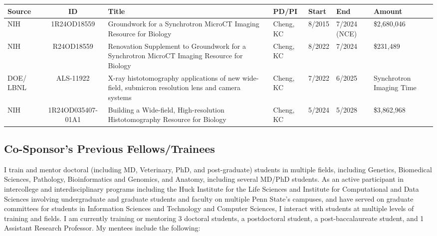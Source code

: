 \documentclass{NIHGrant}
\begin{document}
\begin{center}
\renewcommand{\arraystretch}{1.3}
  \fontsize{9pt}{9pt}\selectfont
  \begin{tabular}{| p{0.5in} | c | p{1.5in} | p{1in} | p{0.5in} | p{0.5in} | p{0.7in} |}
    \hline 
    \textbf{Source} & \textbf{ID} & \textbf{Title} & \textbf{PD/PI} & \textbf{Start} & \textbf{End} & \textbf{Amount} \\
    \hline
    NIH & 1R24OD18559 & Groundwork for a Synchrotron MicroCT Imaging Resource for Biology &  Cheng, KC & 8/2015  & 7/2024 (NCE)&\$2,680,046 \\
    \hline
    NIH & R24OD18559 & Renovation Supplement to Groundwork for a Synchrotron MicroCT Imaging Resource for Biology &  Cheng, KC & 8/2022  & 7/2024 & \$231,489 \\
    \hline
    DOE/ LBNL & ALS-11922 & X-ray histotomography applications of new wide-field, submicron resolution lens and camera systems & Cheng, KC & 7/2022 & 6/2025 & Synchrotron Imaging Time \\
    \hline 
    NIH & 1R24OD035407-01A1 & Building a Wide-field, High-resolution Histotomography Resource for Biology & Cheng, KC & 5/2024 & 5/2028 & \$3,862,968 \\
    \hline
  \end{tabular}
\end{center}

\subsection*{Co-Sponsor's Previous Fellows/Trainees}

I train and mentor doctoral (including MD, Veterinary, PhD, and post-graduate) students in multiple fields, including Genetics, Biomedical Sciences, Pathology, Bioinformatics and Genomics, and Anatomy, including several MD/PhD students. As an active participant in intercollege and interdisciplinary programs including the Huck Institute for the Life Sciences and Institute for Computational and Data Sciences involving undergraduate and graduate students and faculty on multiple Penn State's campuses, and have served on graduate committees for students in Information Sciences and Technology and Computer Sciences, I interact with students at multiple levels of training and fields.  I am currently training or mentoring 3 doctoral students, a postdoctoral student, a post-baccalaureate student, and 1 Assistant Research Professor. My mentees include the following:
\end{document}
